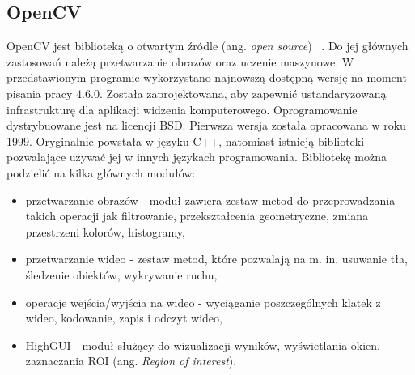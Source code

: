 \subsection{OpenCV}
OpenCV jest biblioteką o otwartym źródle (ang. \textit{open source})~\cite{open_cv,open_cv_docs} .
Do jej głównych zastosowań należą przetwarzanie obrazów oraz uczenie maszynowe.
W przedstawionym programie wykorzystano najnowszą dostępną wersję na moment pisania pracy $4.6.0$.
Została zaprojektowana, aby zapewnić ustandaryzowaną infrastrukturę dla aplikacji widzenia komputerowego.
Oprogramowanie dystrybuowane jest na licencji BSD.
Pierwsza wersja została opracowana w roku 1999.
Oryginalnie powstała w języku C++, natomiast istnieją biblioteki pozwalające używać jej w innych językach programowania.
Bibliotekę można podzielić na kilka głównych modułów:
\begin{itemize}
    \item przetwarzanie obrazów - moduł zawiera zestaw metod do przeprowadzania takich operacji jak filtrowanie, przekształcenia geometryczne, zmiana przestrzeni kolorów, histogramy,
    \item przetwarzanie wideo - zestaw metod, które pozwalają na m. in. usuwanie tła, śledzenie obiektów, wykrywanie ruchu,
    \item operacje wejścia/wyjścia na wideo - wyciąganie poszczególnych klatek z wideo, kodowanie, zapis i odczyt wideo,
    \item HighGUI - moduł służący do wizualizacji wyników, wyświetlania okien, zaznaczania ROI (ang. \textit{Region of interest}).
\end{itemize}

